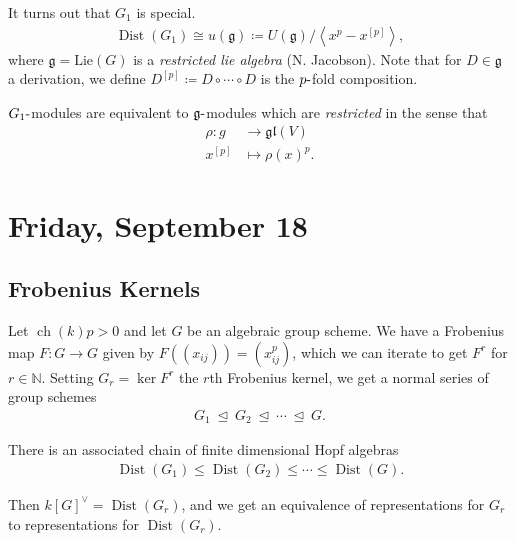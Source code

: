 \begin{remark}

It turns out that \(G_1\) is special.
\begin{align*}  
\operatorname{Dist}(G_1) \cong u({\mathfrak{g}}) \coloneqq U({\mathfrak{g}}) / \left\langle{x^p - x^{[p]}}\right\rangle
,\end{align*}
where \({\mathfrak{g}}= \mathrm{Lie}(G)\) is a \emph{restricted lie
algebra} (N. Jacobson). Note that for \(D\in {\mathfrak{g}}\) a
derivation, we define \(D^{[p]} \coloneqq D\circ \cdots \circ D\) is the
\(p{\hbox{-}}\)fold composition.

\(G_1{\hbox{-}}\)modules are equivalent to
\({\mathfrak{g}}{\hbox{-}}\)modules which are \emph{restricted} in the
sense that
\begin{align*}  
\rho: g &\to {\mathfrak{gl}}(V) \\
x^{[p]} &\mapsto \rho(x)^p
.\end{align*}

\end{remark}

\hypertarget{friday-september-18}{%
\section{Friday, September 18}\label{friday-september-18}}

\hypertarget{frobenius-kernels-1}{%
\subsection{Frobenius Kernels}\label{frobenius-kernels-1}}

Let \(\operatorname{ch}(k) p > 0\) and let \(G\) be an algebraic group
scheme. We have a Frobenius map \(F:G\to G\) given by
\(F((x_{ij})) = (x_{ij}^p)\), which we can iterate to get \(F^r\) for
\(r\in {\mathbb{N}}\). Setting \(G_r = \ker F^r\) the \(r\)th Frobenius
kernel, we get a normal series of group schemes
\begin{align*}  
G_1 {~\trianglelefteq~}G_2 {~\trianglelefteq~}\cdots {~\trianglelefteq~}G
.\end{align*}

There is an associated chain of finite dimensional Hopf algebras
\begin{align*}  
\operatorname{Dist}(G_1) \leq \operatorname{Dist}(G_2) \leq \cdots \leq \operatorname{Dist}(G)
.\end{align*}

Then \(k[G]^\vee= \operatorname{Dist}(G_r)\), and we get an equivalence
of representations for \(G_r\) to representations for
\(\operatorname{Dist}(G_r)\).

